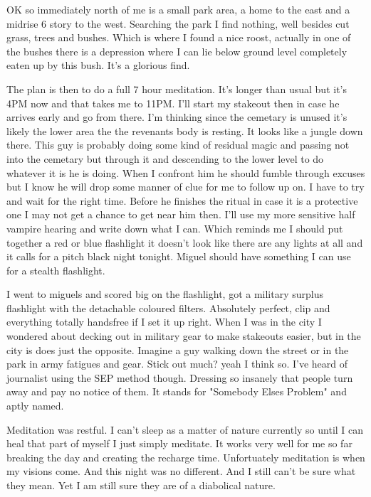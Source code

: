 OK so immediately north of me is a small park area, a home to the east and a midrise 6 story to the west. Searching the park I find nothing, well besides cut grass, trees and bushes. Which is where I found a nice roost, actually in one of the bushes there is a depression where I can lie below ground level completely eaten up by this bush. It's a glorious find.

The plan is then to do a full 7 hour meditation. It's longer than usual but it's 4PM now and that takes me to 11PM. I'll start my stakeout then in case he arrives early and go from there. I'm thinking since the cemetary is unused it's likely the lower area the the revenants body is resting. It looks like a jungle down there. This guy is probably doing some kind of residual magic and passing not into the cemetary but through it and descending to the lower level to do whatever it is he is doing. When I confront him he should fumble through excuses but I know he will drop some manner of clue for me to follow up on. I have to try and wait for the right time. Before he finishes the ritual in case it is a protective one I may not get a chance to get near him then. I'll use my more sensitive half vampire hearing and write down what I can. Which reminds me I should put together a red or blue flashlight it doesn't look like there are any lights at all and it calls for a pitch black night tonight. Miguel should have something I can use for a stealth flashlight.

I went to miguels and scored big on the flashlight, got a military surplus flashlight with the detachable coloured filters. Absolutely perfect, clip and everything totally handsfree if I set it up right. When I was in the city I wondered about decking out in military gear to make stakeouts easier, but in the city is does just the opposite. Imagine a guy walking down the street or in the park in army fatigues and gear. Stick out much? yeah I think so. I've heard of journalist using the SEP method though. Dressing so insanely that people turn away and pay no notice of them. It stands for "Somebody Elses Problem" and aptly named.

Meditation was restful. I can't sleep as a matter of nature currently so until I can heal that part of myself I just simply meditate. It works very well for me so far breaking the day and creating the recharge time. Unfortuately meditation is when my visions come. And this night was no different. And I still can't be sure what they mean. Yet I am still sure they are of a diabolical nature.

